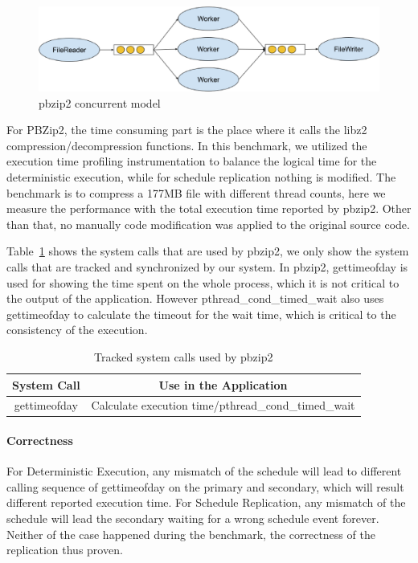 \begin{figure}
\centering
\includegraphics[width=0.8\columnwidth]{figures/pbzip2_model}
\caption{pbzip2 concurrent model}
\label{f:pbzip_model}
\end{figure}

For PBZip2, the time consuming part is the place where it calls the libz2 compression/decompression functions. In this benchmark, we utilized the execution time profiling instrumentation to balance the logical time for the deterministic execution, while for schedule replication nothing is modified. The benchmark is to compress a 177MB file with different thread counts, here we measure the performance with the total execution time reported by pbzip2. Other than that, no manually code modification was applied to the original source code.

Table~\ref{t:pbzip2_syscall} shows the system calls that are used by pbzip2, we only show the system calls that are tracked and synchronized by our system. In pbzip2,  gettimeofday is used for showing the time spent on the whole process, which it is not critical to the output of the application. However pthread\_cond\_timed\_wait also uses gettimeofday to calculate the timeout for the wait time, which is critical to the consistency of the execution.

\begin{table}
 \caption{Tracked system calls used by pbzip2}
\begin{center}
 \begin{tabular}{c | c}
 System Call & Use in the Application\\ \hline
 gettimeofday & Calculate execution time/pthread\_cond\_timed\_wait
 \end{tabular}
\end{center}
\label{t:pbzip2_syscall}
\end{table}

\paragraph{Correctness} For Deterministic Execution, any mismatch of the schedule will lead to different calling sequence of gettimeofday on the primary and secondary, which will result different reported execution time. For Schedule Replication, any mismatch of the schedule will lead the secondary waiting for a wrong schedule event forever. Neither of the case happened during the benchmark, the correctness of the replication thus proven.


